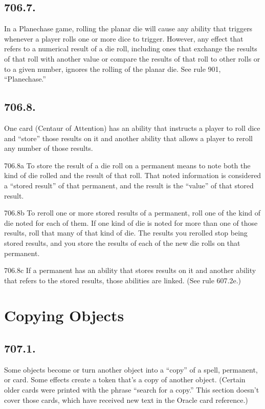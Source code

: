 \subsection*{706.7.}
In a Planechase game, rolling the planar die will cause any ability that triggers whenever a player rolls one or more dice to trigger. However, any effect that refers to a numerical result of a die roll, including ones that exchange the results of that roll with another value or compare the results of that roll to other rolls or to a given number, ignores the rolling of the planar die. See rule 901, “Planechase.”

\subsection*{706.8.}
One card (Centaur of Attention) has an ability that instructs a player to roll dice and “store” those results on it and another ability that allows a player to reroll any number of those results.

706.8a To store the result of a die roll on a permanent means to note both the kind of die rolled and the result of that roll. That noted information is considered a “stored result” of that permanent, and the result is the “value” of that stored result.

706.8b To reroll one or more stored results of a permanent, roll one of the kind of die noted for each of them. If one kind of die is noted for more than one of those results, roll that many of that kind of die. The results you rerolled stop being stored results, and you store the results of each of the new die rolls on that permanent.

706.8c If a permanent has an ability that stores results on it and another ability that refers to the stored results, those abilities are linked. (See rule 607.2e.)

\section{Copying Objects}
\subsection*{707.1.}
Some objects become or turn another object into a “copy” of a spell, permanent, or card. Some effects create a token that’s a copy of another object. (Certain older cards were printed with the phrase “search for a copy.” This section doesn’t cover those cards, which have received new text in the Oracle card reference.)


